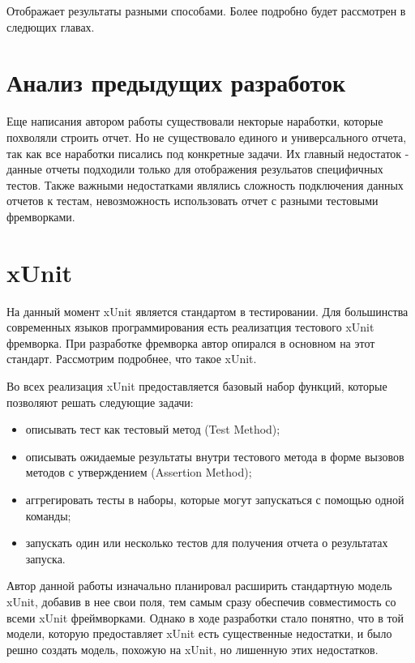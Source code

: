 Отображает результаты разными способами. Более подробно будет рассмотрен в следющих главах.

\section{Анализ предыдущих разработок}

Еще написания автором работы существовали некторые наработки, которые похволяли строить отчет. Но не существовало единого и универсального отчета, так как все наработки писались под конкретные задачи. Их главный недостаток - данные отчеты подходили только для отображения резульатов специфичных тестов. Также важными недостатками являлись сложность подключения данных отчетов к тестам, невозможность использовать отчет с разными тестовыми фремворками. 

\section{xUnit}

На данный момент xUnit является стандартом в тестировании. Для большинства современных языков программирования есть реализатция тестового xUnit фремворка. При разработке фремворка автор опирался в основном на этот стандарт. Рассмотрим подробнее, что такое xUnit.

Во всех реализация xUnit предоставляется базовый набор функций, которые позволяют решать следующие задачи:

\begin{itemize}
\item описывать тест как тестовый метод (Test Method);
\item описывать ожидаемые результаты внутри тестового метода в форме вызовов методов с утверждением (Assertion Method);
\item аггрегировать тесты в наборы, которые могут запускаться с помощью одной команды;
\item запускать один или несколько тестов для получения отчета о результатах запуска.
\end{itemize}

Автор данной работы изначально планировал расширить стандартную модель xUnit, добавив в нее свои поля, тем самым сразу обеспечив совместимость со всеми xUnit фреймворками. Однако в ходе разработки стало понятно, что в той модели, которую предоставляет xUnit есть существенные недостатки, и было решно создать модель, похожую на xUnit, но лишенную этих недостатков. 

